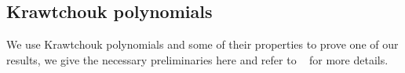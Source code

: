 \documentclass[11pt]{llncs}
\begin{document}










\subsection{Krawtchouk polynomials}
We use Krawtchouk polynomials and some of their properties to prove one of our results, we give the necessary preliminaries here and refer to \eg ~\cite{book:MacSlo78} for more details.
\end{document}

